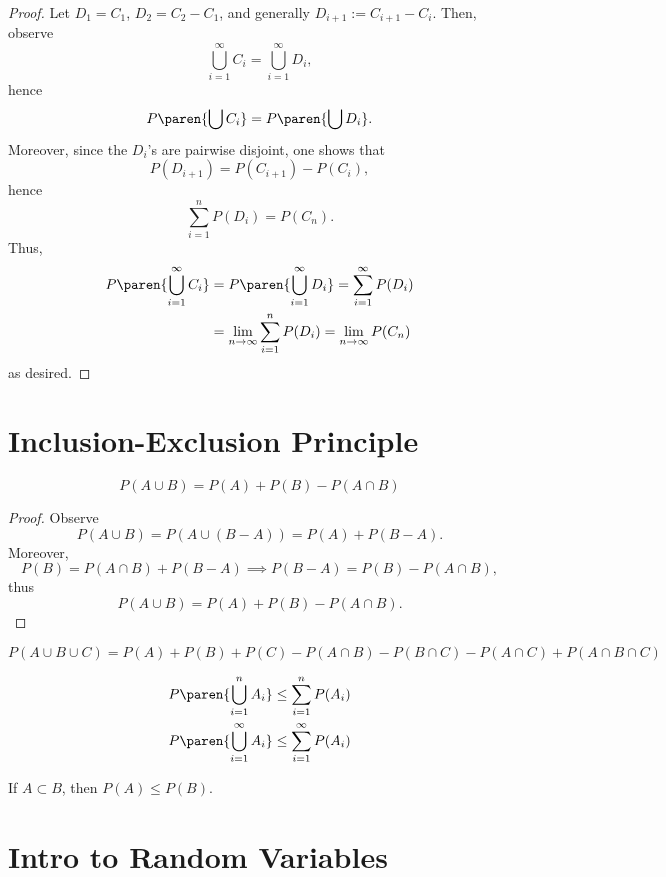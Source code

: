 \documentclass[11pt]{article}
\begin{document}
\begin{proof}
    Let $D_1=C_1$, $D_2 = C_2-C_1$, and generally $D_{i+1}:= C_{i+1}-C_i$. Then, observe
    $$\bigcup _{i=1}^\infty C_i = \bigcup _{i=1}^\infty D_i,$$
    hence
    $$P\paren{\bigcup C_i}=P\paren{\bigcup D_i}.$$
    Moreover, since the $D_i$'s are pairwise disjoint, one shows that
    $$P(D_{i+1})=P(C_{i+1})-P(C_i),$$
    hence
    $$\sum_{i=1}^nP(D_i) = P(C_n).$$
    Thus,
    \begin{align*}
        P\paren{\bigcup_{i=1}^\infty C_i} &=P\paren{\bigcup_{i=1}^\infty D_i}=\sum_{i=1}^\infty P(D_i) 
        \\ &= \lim_{n \to \infty}\sum_{i=1}^nP(D_i) = \lim_{n \to \infty}P(C_n)
    \end{align*}
    as desired.
\end{proof}

\section{Inclusion-Exclusion Principle}

\begin{thm}
$$P(A\cup B) = P(A) + P(B) - P(A \cap B)$$    
\end{thm}

\begin{proof}
    Observe
    $$P(A \cup B) = P(A \cup (B-A)) = P(A) + P(B-A).$$
    Moreover,
    $$P(B) = P(A\cap B) + P(B-A) \implies P(B-A) = P(B) - P(A \cap B),$$
    thus
    $$P(A \cup B) =  P (A) + P(B) - P(A\cap B).$$
\end{proof}

\begin{cor}
    $$P(A \cup B \cup C) = P(A) + P(B) + P(C) - P(A \cap B) - P(B\cap C) - P(A \cap C) + P (A\cap B \cap C)$$
\end{cor}

\begin{prop}
    \begin{align*}
        P\paren{\bigcup_{i=1}^n A_i} \leq \sum_{i=1}^n P(A_i)
        \\ P\paren{\bigcup_{i=1}^\infty A_i} \leq \sum_{i=1}^\infty P(A_i)
    \end{align*}
\end{prop}

\begin{prop}
    If $A \subset B$, then $P(A) \leq P(B)$.
\end{prop}

\section{Intro to Random Variables}
\end{document}
